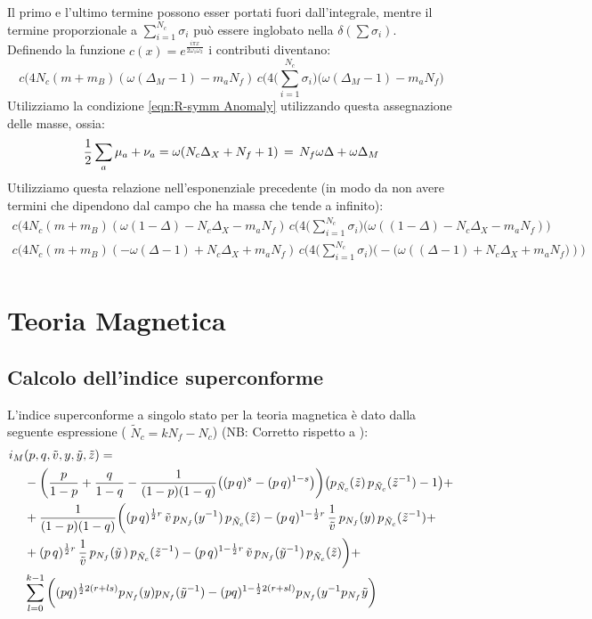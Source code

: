 \documentclass[a4paper,12pt]{article}
\begin{document}
Il primo e l'ultimo termine possono esser portati fuori dall'integrale, mentre il termine proporzionale a $ \sum_{i=1}^{N_c}	\sigma_i  $ può essere inglobato nella $\delta( \sum \sigma_i)$.\\
Definendo la funzione $ c(x) = e^{ \frac{i \pi x }{2 \omega_1 \omega_2}}$ i contributi diventano:
$$
c( 4 N_c  ( m  + m_B ) ( \omega (\Delta_M - 1) -  m_a N_f )\,  c( 4\big( \sum_{i=1}^{N_c}	 \sigma_i  \big) \big (\omega (\Delta_M - 1) -  m_a N_f \big)
$$
Utilizziamo la condizione \ref{eqn:R-symm Anomaly} utilizzando questa assegnazione delle masse, ossia:
\begin{equation}
  { 1 \over 2 } \sum_a \mu_a + \nu_a  = \omega ( N_c \Delta_X + N_f + 1 )  \, = \, N_f \omega \Delta + \omega \Delta_M 
\end{equation}
Utilizziamo questa relazione nell'esponenziale precedente (in modo da non avere termini che dipendono dal campo che ha massa che tende a infinito):
\begin{align*}
c( 4 N_c  ( m  + m_B ) ( \omega (1 - \Delta)  - N_c \Delta_X -  m_a N_f )\,  c( 4\big( \sum_{i=1}^{N_c}	 \sigma_i  \big) \big ( \omega( (1 - \Delta)  - N_c \Delta_X  -  m_a N_f ) \big)\\
c( 4 N_c  ( m  + m_B ) (-\omega ( \Delta-1)  +  N_c \Delta_X  +  m_a N_f )\,  c( 4\big( \sum_{i=1}^{N_c}	 \sigma_i  \big) \big ( - \big( \omega (( \Delta -1 )  + N_c \Delta_X  +  m_a N_f \big) ) \big)\\
\end{align*}

\section{ Teoria Magnetica}
\subsection{Calcolo dell'indice superconforme}
L'indice superconforme a singolo stato per la teoria magnetica è dato dalla seguente espressione ( $\tilde N_c = k N_f - N_c$) (NB: Corretto rispetto a \citep{Dolan:2008qi}):
\begin{align*}
 i_M &(p,q, \tilde v, y,\tilde y ,\tilde z) =  \\ 
& -\bigg({p \over 1-p}+{q \over 1-q} -{1 \over (1-p)(1-q)} \big((p\,q)^{s}- (p\,q)^{1-s}\big)
\bigg) \big( p_{\tilde N_c}( \tilde z)\, p_{\tilde N_c}(\tilde z^{-1})-1\big ) + \\ 
& +{1\over (1-p)(1-q)}\bigg((p\,q)^{{1 \over 2 } r} \,\tilde v \, p_{N_f}(y^{-1})\, p_{\tilde N_c}(\tilde z)
- (p\,q)^{1-  {1\over 2}r} \, {1 \over \tilde v}\, p_{{N_f}}(y)\, p_{{\tilde N_c}}(\tilde z^{-1}) + \\
& + (p\,q)^{{1 \over 2 } r}\, {1\over \tilde v}\, p_{{N_f}}({\tilde y}\,) \, p_{{\tilde N_c}}(\tilde z^{-1})
- (p\,q)^{1-{1\over 2}r} \, \tilde v \, p_{N_f}({\tilde y}^{-1})\, p_{\tilde N_c}(\tilde z)\bigg) +  \,\\
&\sum_{l=0}^{k-1}   \bigg( (pq)^{ {1 \over 2 } 2 ( r + l s  )} p_{N_f}(y) p_{N_f}(\tilde y^{-1}) - (pq)^{1 -  {1 \over 2 } 2 ( r + s l )} p_{N_f}(y^{-1} p_{N_f}{\tilde y}\bigg)  \\
\end{align*}
\end{document}
